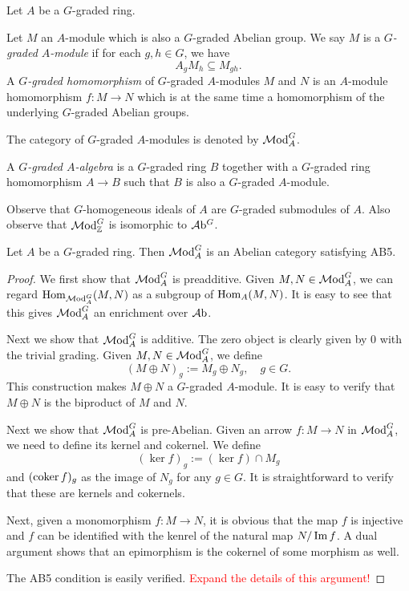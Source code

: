 \begin{definition}
    Let $A$ be a $G$-graded ring. 
    
    Let $M$ an $A$-module which is also a $G$-graded Abelian group. We say $M$ is a \emph{$G$-graded $A$-module} if for each $g,h\in G$, we have
    \[
        A_gM_h\subseteq M_{gh}.  
    \]
    A \emph{$G$-graded homomorphism} of $G$-graded $A$-modules $M$ and $N$ is an $A$-module homomorphism $f:M\rightarrow N$ which is at the same time a homomorphism of  the underlying $G$-graded Abelian groups.

    The category of $G$-graded $A$-modules is denoted by $\mathcal{M}\mathrm{od}^G_A$.

    A \emph{$G$-graded $A$-algebra} is a $G$-graded ring $B$ together with a $G$-graded ring homomorphism $A\rightarrow B$ such that $B$ is also a $G$-graded $A$-module.
\end{definition}
Observe that $G$-homogeneous ideals of $A$ are $G$-graded submodules of $A$. Also observe that $\mathcal{M}\mathrm{od}^G_{\mathbb{Z}}$ is isomorphic to $\mathcal{A}\mathrm{b}^G$.

\begin{proposition}
    Let $A$ be a $G$-graded ring. Then $\mathcal{M}\mathrm{od}^G_A$ is an Abelian category satisfying AB5.
\end{proposition}
\begin{proof}
    We first show that $\mathcal{M}\mathrm{od}^G_A$ is preadditive. Given $M,N\in \mathcal{M}\mathrm{od}^G_A$, we can regard $\operatorname{Hom}_{\mathcal{M}\mathrm{od}^G_A}(M,N)$ as a subgroup of $\operatorname{Hom}_A(M,N)$. It is easy to see that this gives $\mathcal{M}\mathrm{od}^G_A$ an enrichment over $\mathcal{A}\mathrm{b}$.

    Next we show that $\mathcal{M}\mathrm{od}^G_A$ is additive. The zero object is clearly given by $0$ with the trivial grading. Given $M,N\in \mathcal{M}\mathrm{od}^G_A$, we define
    \[
        (M\oplus N)_g:=M_g\oplus N_g,\quad g\in G.
    \]
    This construction makes $M\oplus N$ a $G$-graded $A$-module. It is easy to verify that $M\oplus N$ is the biproduct of $M$ and $N$.

    Next we show that $\mathcal{M}\mathrm{od}^G_A$ is pre-Abelian. Given an arrow $f:M\rightarrow N$ in  $\mathcal{M}\mathrm{od}^G_A$, we need to define its kernel and cokernel. We define
    \[
        (\ker f)_g:=(\ker f)\cap M_g  
    \]
    and $(\operatorname{coker} f)_g$ as the image of $N_g$ for any $g\in G$. It is straightforward to verify that these are kernels and cokernels.

    Next, given a monomorphism $f:M\rightarrow N$, it is obvious that the map $f$ is injective and $f$ can be identified with the kenrel of the natural map $N/\operatorname{Im} f$. A dual argument shows that an epimorphism is the cokernel of some morphism as well.

    The AB5 condition is easily verified. \textcolor{red}{Expand the details of this argument!}
\end{proof}

